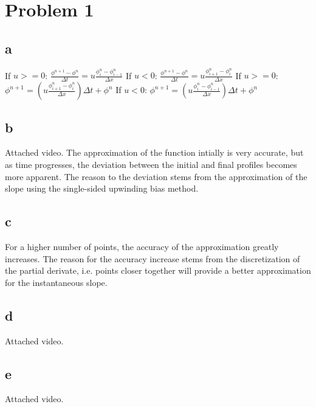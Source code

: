 \documentclass{article}
\begin{document}
 \section{Problem 1}
\subsection{a}
If $u>=0$:
$\frac{\phi^{n+1}-\phi^{n}}{\Delta t} = u\frac{\phi^n_{i} - \phi^n_{i-1}}{\Delta x}$ \newline
If $u<0$:
$\frac{\phi^{n+1}-\phi^{n}}{\Delta t} = u\frac{\phi^n_{i+1} - \phi^n_{i}}{\Delta x}$\newline
\newline
If $u>=0$: \newline
\newline
$\phi^{n+1} =\left(u\frac{\phi^n_{i+1} - \phi^n_{i}}{\Delta x}\right)\Delta t + \phi^{n}$
\newline
If $u<0$: \newline
\newline
$\phi^{n+1} =\left(u\frac{\phi^n_{i} - \phi^n_{i-1}}{\Delta x}\right)\Delta t + \phi^{n}$


\subsection{b}
Attached video.
The approximation of the function intially is very accurate, but as time progresses, the deviation between the initial and final profiles becomes more apparent. The reason to the deviation stems from the approximation of the slope using the single-sided upwinding bias method.

\subsection{c}
For a higher number of points, the accuracy of the approximation greatly increases. The reason for the accuracy increase stems from the discretization of the partial derivate, i.e. points closer together will provide a better approximation for the instantaneous slope.

\subsection{d}
Attached video.

\subsection{e}
Attached video.
\end{document}

